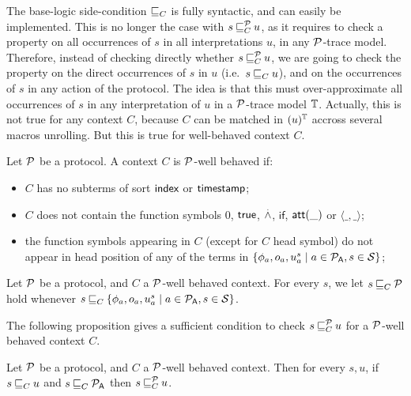 The base-logic side-condition $\mathbin{\sqsubseteq}_{C}$ is fully syntactic, and can easily be implemented. This is no longer the case with $s \mathbin{\sqsubseteq}^{\mathcal{P}}_{C} u$, as it requires to check a property on all occurrences of $s$ in all interpretations $u$, in any $\mathcal{P}$-trace model. Therefore, instead of checking directly whether $s \mathbin{\sqsubseteq}^{\mathcal{P}}_{C} u$, we are going to check the property on the direct occurrences of $s$ in $u$ (i.e.\ $s \mathbin{\sqsubseteq}_{C} u$), and on the occurrences of $s$ in any action of the protocol. The idea is that this must over-approximate all occurrences of $s$ in any interpretation of $u$ in a $\mathcal{P}$-trace model $\mathbb{T}$. Actually, this is not true for any context $C$, because $C$ can be matched in $(u)^{\mathbb{T}}$ accross several macros unrolling. But this is true for well-behaved context $C$. 

\begin{definition}
  Let $\mathcal{P}$ be a protocol. A context $C$ is $\mathcal{P}$-well behaved if:
  \begin{itemize}
  \item $C$ has no subterms of sort $\textsf{index}$ or $\textsf{timestamp}$;
  \item $C$ does not contain the function symbols $0$, $\textsf{true}$, $\stackrel{.}{\wedge}$, $\mathsf{if}$, $\mathsf{att}(\_)$ or $\langle \_,\_\rangle$;
  \item the function symbols appearing in $C$ (except for $C$ head symbol) do not appear in head position of any of the terms in $\{\phi_a,o_a,u^s_a \mid a \in \mathcal{P}_{\textsf{A}}, s \in\mathcal{S}\}$;
  \end{itemize}
\end{definition}


\begin{definition}
  Let $\mathcal{P}$ be a protocol, and $C$ a $\mathcal{P}$-well behaved context. For every $s$, we let $s \mathbin{\sqsubseteq}_{C} \mathcal{P}$ hold whenever $s \mathbin{\sqsubseteq}_{C} \{\phi_a,o_a,u^s_a \mid a \in \mathcal{P}_{\textsf{A}}, s \in\mathcal{S}\}$.
\end{definition}

The following proposition gives a sufficient condition to check $s \mathbin{\sqsubseteq}^{\mathcal{P}}_{C} u$ for a $\mathcal{P}$-well behaved context $C$.

\begin{proposition}
  Let $\mathcal{P}$ be a protocol, and $C$ a $\mathcal{P}$-well behaved context. Then for every $s,u$, if $s \mathbin{\sqsubseteq}_{C} u$ and $s \mathbin{\sqsubseteq}_{C} \mathcal{P}_{\textsf{A}}$ then $s \mathbin{\sqsubseteq}^{\mathcal{P}}_{C} u$.
\end{proposition}


